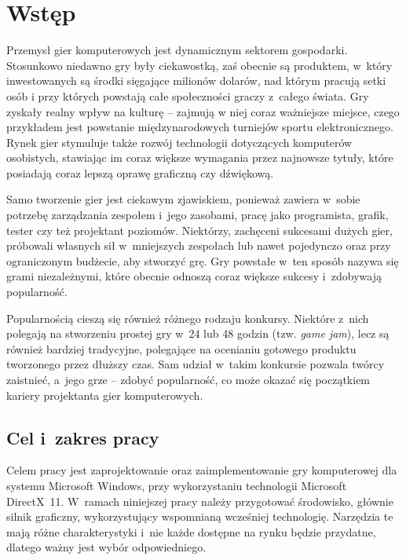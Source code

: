 
\chapter{Wst\k{e}p}

Przemysł gier komputerowych jest dynamicznym sektorem gospodarki. Stosunkowo niedawno gry były ciekawostką, zaś obecnie są produktem, w~który inwestowanych są środki sięgające milionów dolarów, nad którym pracują setki osób i przy których powstają całe społeczności graczy z~całego świata. Gry zyskały realny wpływ na kulturę -- zajmują w niej coraz ważniejsze miejsce, czego przykładem jest powstanie międzynarodowych turniejów sportu elektronicznego. Rynek gier stymuluje także rozwój technologii dotyczących komputerów osobistych, stawiając im coraz większe wymagania przez najnowsze tytuły, które posiadają coraz lepszą oprawę graficzną czy dźwiękową.

Samo tworzenie gier jest ciekawym zjawiskiem, ponieważ zawiera w~sobie potrzebę zarządzania zespołem i~jego zasobami, pracę jako programista, grafik, tester czy też projektant poziomów. Niektórzy, zachęceni sukcesami dużych gier, próbowali własnych sił w~mniejszych zespołach lub nawet pojedynczo oraz przy ograniczonym budżecie, aby stworzyć grę.
Gry powstałe w~ten sposób nazywa się grami niezależnymi, które obecnie odnoszą coraz większe sukcesy i~zdobywają popularność.

Popularnością cieszą się również różnego rodzaju konkursy. Niektóre z~nich polegają na stworzeniu prostej gry w~24 lub 48 godzin (tzw. \emph{game jam}), lecz są również bardziej tradycyjne, polegające na ocenianiu gotowego produktu tworzonego przez dłuższy czas. Sam udział w~takim konkursie pozwala twórcy zaistnieć, a~jego grze -- zdobyć popularność, co może okazać się początkiem kariery projektanta gier komputerowych.



\section{Cel i~zakres pracy}

Celem pracy jest zaprojektowanie oraz zaimplementowanie gry komputerowej dla systemu Microsoft Windows, przy wykorzystaniu technologii Microsoft DirectX~11. W~ramach niniejszej pracy należy przygotować środowisko, głównie silnik graficzny, wykorzystujący wspomnianą wcześniej technologię. Narzędzia te mają różne charakterystyki i~nie każde dostępne na rynku będzie przydatne, dlatego ważny jest wybór odpowiedniego. 

